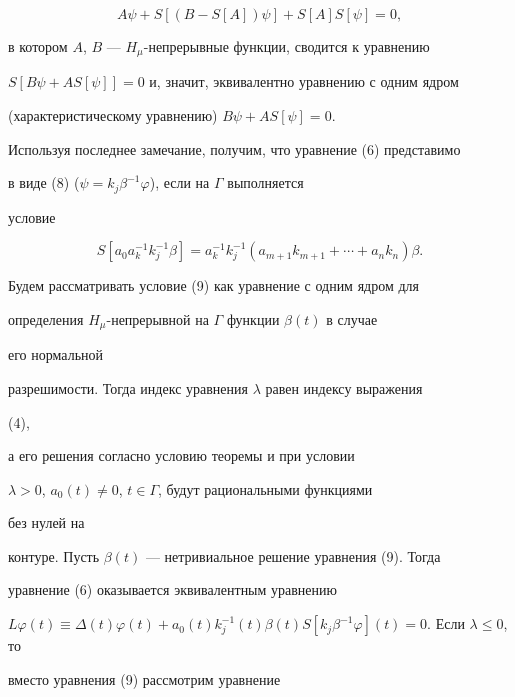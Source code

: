 \begin{pf}
\begin{equation} 


A\psi+S[(B-S[A])\psi]+S[A]S[\psi]=0, 


\end{equation} 


в котором $A$, $B$ --- $H_\mu$-непрерывные функции, сводится к уравнению 


$S[B\psi+AS[\psi]]=0$ и, значит, эквивалентно уравнению с одним ядром 


(характеристическому уравнению) $B\psi+AS[\psi]=0$. 


 


Используя последнее замечание, получим, что уравнение (6) представимо 


в виде (8) ($\psi=k_j\beta^{-1}\varphi$), если на $\Gamma$ выполняется 


условие 


\begin{equation} 


S[a_0a^{-1}_k k^{-1}_j\beta]=a^{-1}_k k^{-1}_j 


(a_{m+1}k_{m+1}+\dotsb+a_n k_n)\beta. 


\end{equation} 


Будем рассматривать условие (9) как уравнение с одним ядром для 


определения $H_\mu$-непрерывной на $\Gamma$ функции $\beta(t)$ в случае 


его нормальной 


разрешимости. Тогда индекс уравнения $\lambda$ равен индексу выражения 


(4), 


а его решения согласно условию теоремы и при условии 


$\lambda>0$, $a_0(t)\ne0$, $t\in\Gamma$, будут рациональными функциями 


без нулей на 


контуре. Пусть $\beta(t)$ --- нетривиальное решение уравнения (9). Тогда 


уравнение (6) оказывается эквивалентным уравнению 


$L\varphi(t)\equiv \Delta(t)\varphi(t)+ a_0(t)k^{-1}_j(t) 


\beta(t)S[k_j\beta^{-1}\varphi](t)=0$. Если $\lambda\le0$, то 


вместо уравнения (9) рассмотрим уравнение 


\begin{equation}



\end{equation}
\end{pf}
